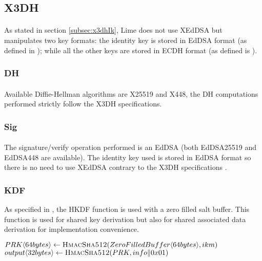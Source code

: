 \documentclass[a4paper,11pt]{article}
\begin{document}
  \subsection{X3DH}
    \paragraph*{}As stated in section \ref{subsec:x3dhIk}, Lime does not use XEdDSA but manipulates two key formats: the identity key is stored in EdDSA format (as defined in \cite{rfc8032}); while all the other keys are stored in ECDH format (as defined is \cite{rfc7748}).
    \subsubsection{DH}
      \paragraph*{}Available Diffie-Hellman algorithms are X25519 and X448, the DH computations performed strictly follow the X3DH specifications.
    \subsubsection{Sig}
      \paragraph*{}The signature/verify operation performed is an EdDSA (both EdDSA25519 and EdDSA448 are available). The identity key used is stored in EdDSA format so there is no need to use XEdDSA contrary to the X3DH specifications \cite[section 2.2]{x3dh}.
    \subsubsection{KDF}
      As specified in \cite[section 2.2]{x3dh}, the HKDF function\cite{rfc5869} is used with a zero filled salt buffer. This function is used for shared key derivation but also for shared associated data derivation for implementation convenience.
      \begin{algorithmic}
        \Statex
          \State $PRK\langle 64bytes\rangle  \gets \Call{HmacSha512}{ZeroFilledBuffer\langle 64bytes\rangle, ikm}$
          \State $output\langle 32bytes\rangle \gets \Call{HmacSha512}{PRK, info\Arrowvert 0x01}$
          \State {}
        \EndFunction
      \end{algorithmic}
\end{document}
